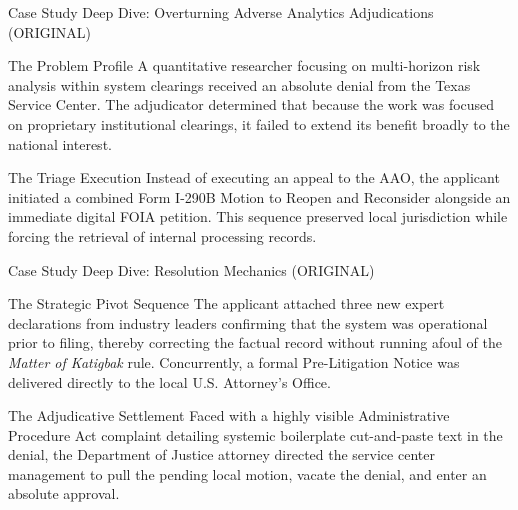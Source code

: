 \documentclass[11pt]{beamer}
\begin{document}
	
	\begin{frame}{Case Study Deep Dive: Overturning Adverse Analytics Adjudications (ORIGINAL)}
		\scriptsize
		\begin{block}{The Problem Profile}
			A quantitative researcher focusing on multi-horizon risk analysis within system clearings received an absolute denial from the Texas Service Center. The adjudicator determined that because the work was focused on proprietary institutional clearings, it failed to extend its benefit broadly to the national interest.
		\end{block}
		\begin{block}{The Triage Execution}
			Instead of executing an appeal to the AAO, the applicant initiated a combined Form I-290B Motion to Reopen and Reconsider alongside an immediate digital FOIA petition. This sequence preserved local jurisdiction while forcing the retrieval of internal processing records.
		\end{block}
	\end{frame}
	
	\begin{frame}{Case Study Deep Dive: Resolution Mechanics (ORIGINAL)}
		\scriptsize
		\begin{block}{The Strategic Pivot Sequence}
			The applicant attached three new expert declarations from industry leaders confirming that the system was operational prior to filing, thereby correcting the factual record without running afoul of the \textit{Matter of Katigbak} rule. Concurrently, a formal Pre-Litigation Notice was delivered directly to the local U.S. Attorney’s Office.
		\end{block}
		\begin{block}{The Adjudicative Settlement}
			Faced with a highly visible Administrative Procedure Act complaint detailing systemic boilerplate cut-and-paste text in the denial, the Department of Justice attorney directed the service center management to pull the pending local motion, vacate the denial, and enter an absolute approval.
		\end{block}
	\end{frame}
	
	
\end{document}
